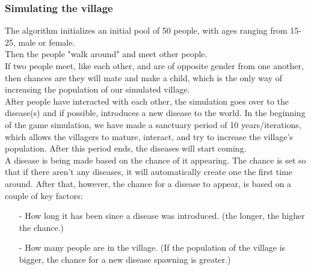 \documentclass[conference,compsoc]{IEEEtran}
\begin{document}
\subsubsection{Simulating the village}
The algorithm initializes an initial pool of 50 people, with ages ranging from 15-25, male or female.\\
Then the people "walk around" and meet other people.\\
If two people meet, like each other, and are of opposite gender from one another, then chances are they will mate and make a child, which is the only way of increasing the population of our simulated village.\\
After people have interacted with each other, the simulation goes over to the disease(s) and if possible, introduces a new disease to the world. In the beginning of the game simulation, we have made a sanctuary period of 10 years/iterations, which allows the villagers to mature, interact, and try to increase the village's population. After this period ends, the diseases will start coming.\\
A disease is being made based on the chance of it appearing. The chance is set so that if there aren't any diseases, it will automatically create one the first time around. After that, however, the chance for a disease to appear, is based on a couple of key factors:\\
\begin{itemize}
\item[-] How long it has been since a disease was introduced. (the longer, the higher the chance.)
\item[-] How many people are in the village. (If the population of the village is bigger, the chance for a new disease spawning is greater.)
\end{itemize}
\end{document}
